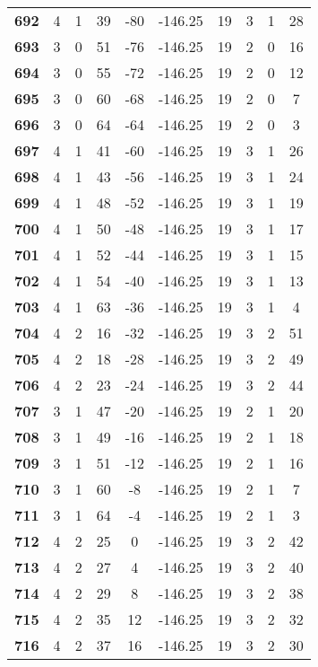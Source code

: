 \documentclass[12pt,letterpaper, onecolumn]{exam}
\begin{document}
\begin{longtable}{cccccccccc}
    \textbf{692} & 4 & 1 & 39 & -80 & -146.25 & 19 & 3 & 1 & 28 \\ 
    \textbf{693} & 3 & 0 & 51 & -76 & -146.25 & 19 & 2 & 0 & 16 \\ 
    \textbf{694} & 3 & 0 & 55 & -72 & -146.25 & 19 & 2 & 0 & 12 \\ 
    \textbf{695} & 3 & 0 & 60 & -68 & -146.25 & 19 & 2 & 0 & 7 \\ 
    \textbf{696} & 3 & 0 & 64 & -64 & -146.25 & 19 & 2 & 0 & 3 \\ 
    \textbf{697} & 4 & 1 & 41 & -60 & -146.25 & 19 & 3 & 1 & 26 \\ 
    \textbf{698} & 4 & 1 & 43 & -56 & -146.25 & 19 & 3 & 1 & 24 \\ 
    \textbf{699} & 4 & 1 & 48 & -52 & -146.25 & 19 & 3 & 1 & 19 \\ 
    \textbf{700} & 4 & 1 & 50 & -48 & -146.25 & 19 & 3 & 1 & 17 \\ 
    \textbf{701} & 4 & 1 & 52 & -44 & -146.25 & 19 & 3 & 1 & 15 \\ 
    \textbf{702} & 4 & 1 & 54 & -40 & -146.25 & 19 & 3 & 1 & 13 \\ 
    \textbf{703} & 4 & 1 & 63 & -36 & -146.25 & 19 & 3 & 1 & 4 \\ 
    \textbf{704} & 4 & 2 & 16 & -32 & -146.25 & 19 & 3 & 2 & 51 \\ 
    \textbf{705} & 4 & 2 & 18 & -28 & -146.25 & 19 & 3 & 2 & 49 \\ 
    \textbf{706} & 4 & 2 & 23 & -24 & -146.25 & 19 & 3 & 2 & 44 \\ 
    \textbf{707} & 3 & 1 & 47 & -20 & -146.25 & 19 & 2 & 1 & 20 \\ 
    \textbf{708} & 3 & 1 & 49 & -16 & -146.25 & 19 & 2 & 1 & 18 \\ 
    \textbf{709} & 3 & 1 & 51 & -12 & -146.25 & 19 & 2 & 1 & 16 \\ 
    \textbf{710} & 3 & 1 & 60 & -8 & -146.25 & 19 & 2 & 1 & 7 \\ 
    \textbf{711} & 3 & 1 & 64 & -4 & -146.25 & 19 & 2 & 1 & 3 \\ 
    \textbf{712} & 4 & 2 & 25 & 0 & -146.25 & 19 & 3 & 2 & 42 \\ 
    \textbf{713} & 4 & 2 & 27 & 4 & -146.25 & 19 & 3 & 2 & 40 \\ 
    \textbf{714} & 4 & 2 & 29 & 8 & -146.25 & 19 & 3 & 2 & 38 \\ 
    \textbf{715} & 4 & 2 & 35 & 12 & -146.25 & 19 & 3 & 2 & 32 \\ 
    \textbf{716} & 4 & 2 & 37 & 16 & -146.25 & 19 & 3 & 2 & 30 \\ 

\end{longtable}
\end{document}
